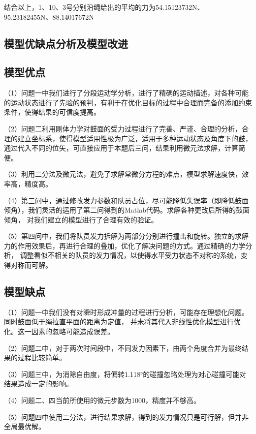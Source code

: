\documentclass[UTF8]{article}
\begin{document}
结合以上，1、10、3号分别沿绳给出的平均的力为54.15123732N、95.23182455N、88.14017672N

\begin{center}
    \section{模型优缺点分析及模型改进}    
\end{center}
\subsection{模型优点}
（1）问题一中我们进行了分段运动学分析，进行了精确的运动描述，对各种可能的运动状态进行了先验的预判，有利于在优化目标的过程中合理而完备的添加约束条件，使得结果的可信度提高。

（2）问题二利用刚体力学对鼓面的受力过程进行了完善、严谨、合理的分析，合理的建立坐标系，使得模型适用性极为广泛，适用于多种运动状态及角度下的鼓，
通过代入不同的位矢，可直接应用于本题后三问，结果利用微元法求解，计算简便。

（3）利用二分法及微元法，避免了求解常微分方程的难点，模型求解速度快，效率高，精度高。

（4）第三问中，通过修改发力参数和队员占位，尽可能降低失误率（即降低鼓面倾角），我们灵活的运用了第二问得到的Matlab代码。求解各种更改后所得的鼓面倾角，
对我们建立的模型进行了合理有效的验证。

（5）第四问中，我们将队员发力拆解为两部分分别进行撞击和旋转。独立的求解力的作用效果后，再进行合理的叠加，优化了解决问题的方式。通过精确的力学分析，
调整看似不相关的队员的发力情况，以使得水平受力状态不对称的系统，变得对称而可解。


\subsection{模型缺点}
（1）问题一中我们没有对瞬时形成冲量的过程进行分析，可能存在理想化问题。同时鼓面低于绳拉直平面的距离为定值，
并未将其代入非线性优化模型进行优化。这一因素的忽略可能造成误差。

（2）问题二中，对于两次时间段中，不同发力因素下，由两个角度合并为最终结果的过程比较简单。

（3）问题三中，为消除自由度，将偏转1.118°的碰撞忽略处理为对心碰撞可能对结果造成一定的影响。

（4）问题二、四当前所使用的微元步数为1000，精度并不够高。

（5）问题四中使用二分法，进行结果求解，得到的发力情况只是可行解，但并非全局最优解。
\end{document}
